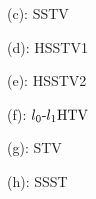 \begin{figure}[t]
\begin{center}
		\vspace{1mm}
		
		\begin{minipage}{0.15\hsize}
			\centerline{\small{(c): SSTV}}
		\end{minipage}
		\begin{minipage}{0.15\hsize}
			\centerline{\small{(d): HSSTV1}}
		\end{minipage}
		\begin{minipage}{0.15\hsize}
			\centerline{\small{(e): HSSTV2}}
		\end{minipage}
		\begin{minipage}{0.15\hsize}
			\centerline{\small{(f): ${l_{0}\text{-}l_{1}\text{HTV}}$}}
		\end{minipage}
		\begin{minipage}{0.15\hsize}
			\centerline{\small{(g): STV}}
		\end{minipage}
		\begin{minipage}{0.15\hsize}
			\centerline{\small{(h): SSST}}
		\end{minipage}
		\begin{minipage}{0.050\hsize}
			\centerline{\hspace{\hsize}} %
		\end{minipage}
		
		\vspace{2mm}
		

\end{center}
\end{figure}
